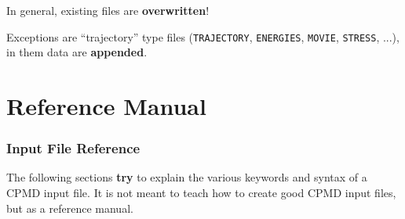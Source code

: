 \documentclass[twoside,10pt,titlepage,a4paper]{article}
\begin{document}
\medskip

In general, existing files are {\bf overwritten}!

\medskip

  Exceptions are ``trajectory'' type files (\texttt{TRAJECTORY},
\texttt{ENERGIES}, \texttt{MOVIE}, \texttt{STRESS}, ...), in them data are {\bf
appended}.

\clearpage
\part{Reference Manual}
\section{Input File Reference}\label{inputfile}
The following sections \textbf{try} to explain the various keywords and
syntax of a CPMD input file. It is not meant to teach how to
create good CPMD input files, but as a reference manual.
\end{document}
